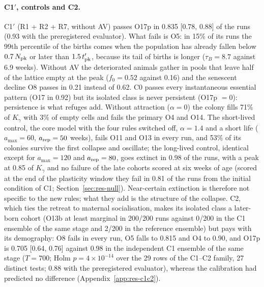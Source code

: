 \paragraph{\textsf{C1}$'$, controls and \textsf{C2}.}
\label{sec:res-c1c2}
\textsf{C1}$'$ (R1 + R2 + R7, without AV) passes O17p in 0.835 [0.78, 0.88] of the runs (0.93 with the preregistered
evaluator). What fails is O5: in 15\% of its runs the 99th percentile of the births comes when the population has
already fallen below $0.7\,N_{\rm pk}$ or later than $1.5\,t'_{\rm pk}$, because its tail of births is longer
($\tau_B=8.7$ against 6.9 weeks). Without AV the deteriorated animals gather in pools that leave half of the lattice
empty at the peak ($f_0=0.52$ against 0.16) and the senescent decline O8 passes in 0.21 instead of 0.62.
\textsf{C0} passes every instantaneous essential pattern (O17 in 0.92) but its isolated class is never persistent
(O17p $=0$): persistence is what refuges add. Without attraction ($\alpha=0$) the colony fills 71\% of $K_\gamma$
with 3\% of empty cells and fails the primary O4 and O14. The short-lived control, the core model with the four rules switched off, $\alpha=1.4$ and a short life
($a_{\max}=60$, $a_{\rm rep}=50$ weeks), fails O11 and O13 in every run, and 53\% of
its colonies survive the first collapse and oscillate; the long-lived control, identical except for $a_{\max}=120$
and $a_{\rm rep}=80$, goes extinct in
0.98 of the runs, with a peak at 0.85 of $K_\gamma$ and no failure of the late cohorts scored at six weeks of age
(scored at the end of the plasticity window they fail in 0.81 of the runs from the initial condition of \textsf{C1};
Section~\ref{sec:res-null}). Near-certain extinction is
therefore not specific to the new rules; what they add is the structure of the collapse.
\textsf{C2}, which ties the retreat to maternal socialisation, makes its isolated class a later-born cohort (O13b at
least marginal in 200/200 runs against 0/200 in the \textsf{C1} ensemble of the same stage and 2/200 in the
reference ensemble) but pays with its demography: O8 fails in every run, O5
falls to 0.815 and O4 to 0.90, and O17p is 0.705 [0.64, 0.76] against 0.98 in the independent \textsf{C1}
ensemble of the same stage ($T=700$; Holm $p=4\times10^{-14}$ over the 29 rows of the \textsf{C1}--\textsf{C2}
family, 27 distinct tests; 0.88 with the preregistered evaluator), whereas the calibration had predicted no difference
(Appendix~\ref{app:res-c1c2}).

